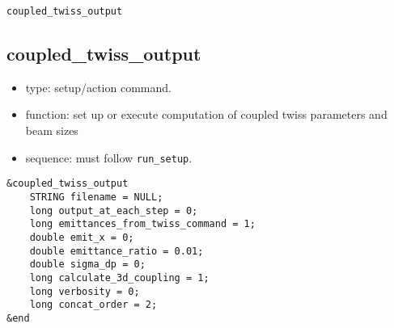 \documentclass[11pt]{article}
\begin{document}
\newpage
\begin{center}{\Large\verb|coupled_twiss_output|}\end{center}
\subsection{coupled\_twiss\_output \label{subsec:coupledtwissoutput}}

\begin{itemize}
\item type: setup/action command.
\item function: set up or execute computation of coupled twiss parameters and beam sizes
\item sequence: must follow \verb|run_setup|.
\end{itemize}

\begin{verbatim}
&coupled_twiss_output
    STRING filename = NULL;
    long output_at_each_step = 0;
    long emittances_from_twiss_command = 1;
    double emit_x = 0;
    double emittance_ratio = 0.01;
    double sigma_dp = 0;
    long calculate_3d_coupling = 1;
    long verbosity = 0;
    long concat_order = 2;
&end
\end{verbatim}
\end{document}
